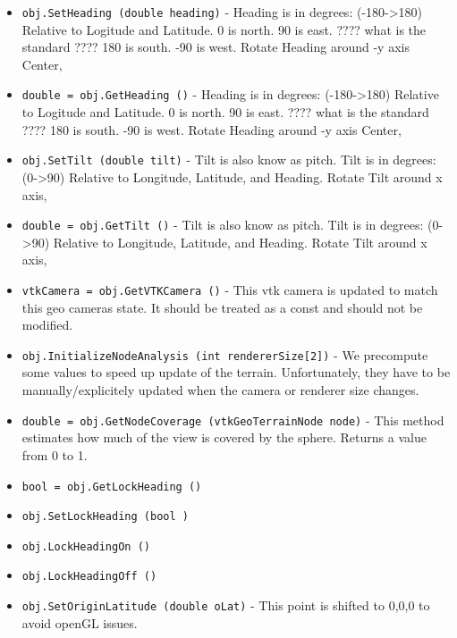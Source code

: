 \begin{itemize}
\item  \verb|obj.SetHeading (double heading)| -  Heading is in degrees:  (-180->180)
   Relative to Logitude and Latitude.
   0 is north. 
   90 is east.       ???? what is the standard ????
   180 is south.
   -90 is west.  
  Rotate Heading    around -y axis Center,     

\item  \verb|double = obj.GetHeading ()| -  Heading is in degrees:  (-180->180)
   Relative to Logitude and Latitude.
   0 is north. 
   90 is east.       ???? what is the standard ????
   180 is south.
   -90 is west.  
  Rotate Heading    around -y axis Center,     

\item  \verb|obj.SetTilt (double tilt)| -  Tilt is also know as pitch.
 Tilt is in degrees: (0->90)
   Relative to Longitude, Latitude, and Heading.
 Rotate Tilt       around x axis,             

\item  \verb|double = obj.GetTilt ()| -  Tilt is also know as pitch.
 Tilt is in degrees: (0->90)
   Relative to Longitude, Latitude, and Heading.
 Rotate Tilt       around x axis,             

\item  \verb|vtkCamera = obj.GetVTKCamera ()| -  This vtk camera is updated to match this geo cameras state.
 It should be treated as a const and should not be modified.

\item  \verb|obj.InitializeNodeAnalysis (int rendererSize[2])| -  We precompute some values to speed up update of the terrain.
 Unfortunately, they have to be manually/explicitely updated
 when the camera or renderer size changes.

\item  \verb|double = obj.GetNodeCoverage (vtkGeoTerrainNode node)| -  This method estimates how much of the view is covered by the sphere.
 Returns a value from 0 to 1.

\item  \verb|bool = obj.GetLockHeading ()|

\item  \verb|obj.SetLockHeading (bool )|

\item  \verb|obj.LockHeadingOn ()|

\item  \verb|obj.LockHeadingOff ()|

\item  \verb|obj.SetOriginLatitude (double oLat)| -  This point is shifted to 0,0,0 to avoid openGL issues.


\end{itemize}
